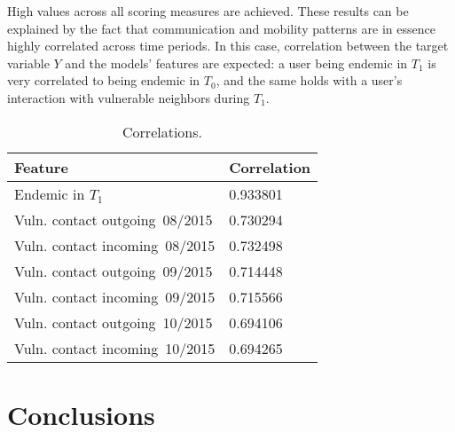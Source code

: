 High values across all scoring measures are achieved. %
These results can be explained by the fact that
communication and mobility patterns are in essence highly correlated across time periods.
In this case, correlation between the target variable $Y$ and the models' features are expected:
a user being endemic in $T_1$ is very correlated to being endemic in $T_0$, and the same holds with a user's interaction with vulnerable neighbors during $T_1$.

\begin{table}\label{tab:featureCorrelations}
	\caption{Correlations.}
	\centering
	\begin{tabular}{l l }
		\toprule
		Feature & Correlation \\
		\midrule
		Endemic in $T_1$        & 0.933801 \\
		Vuln. contact outgoing\ 08/2015  & 0.730294 \\ %
		Vuln. contact incoming\ 08/2015   & 0.732498 \\
		Vuln. contact outgoing\ 09/2015  & 0.714448 \\
		Vuln. contact incoming\ 09/2015   & 0.715566 \\
		Vuln. contact outgoing\ 10/2015  & 0.694106 \\
		Vuln. contact incoming\ 10/2015   & 0.694265 \\
		\bottomrule
	\end{tabular}
\end{table}


%
%



\section{Conclusions}\label{section:conclusions}

